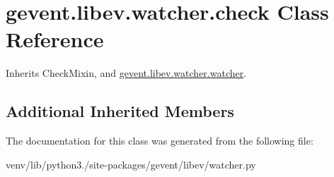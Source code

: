\hypertarget{classgevent_1_1libev_1_1watcher_1_1check}{}\section{gevent.\+libev.\+watcher.\+check Class Reference}
\label{classgevent_1_1libev_1_1watcher_1_1check}


Inherits Check\+Mixin, and \hyperlink{classgevent_1_1libev_1_1watcher_1_1watcher}{gevent.\+libev.\+watcher.\+watcher}.

\subsection*{Additional Inherited Members}


The documentation for this class was generated from the following file\+:\begin{DoxyCompactItemize}
\item 
venv/lib/python3./site-\/packages/gevent/libev/watcher.\+py\end{DoxyCompactItemize}
